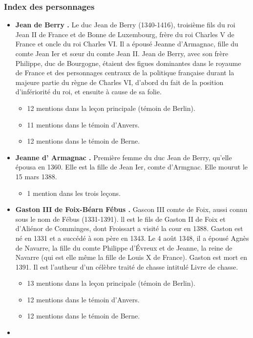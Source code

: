 \documentclass[12pt, a4paper]{article}
\begin{document}
	\subsubsection{Index des personnages}
	\begin{itemize} \item{\textbf{
				Jean
				de
				Berry
				.} Le duc Jean de Berry (1340-1416), troisième fils du roi Jean II de France et de Bonne de Luxembourg, frère du roi Charles V de France et
			oncle du roi Charles VI. Il a épousé Jeanne d'Armagnac, fille du comte Jean Ier et sœur du comte Jean II. Jean de Berry, avec son frère
			Philippe, duc de Bourgogne, étaient des figues dominantes dans le royaume de France et des personnages centraux de la politique française
			durant la majeure partie du règne de Charles VI, d'abord du fait de la position d'infériorité du roi, et ensuite à cause de sa folie. \begin{itemize} \item{12 mentions dans la leçon principale (témoin de Berlin).}  \item{11 mentions dans le témoin d'Anvers.}  \item{12 mentions dans le témoin de Berne.}  \end{itemize}}  \item{\textbf{
				Jeanne
				d'
				Armagnac
				.} Première femme du duc Jean de Berry, qu'elle épousa en 1360. Elle est la fille de Jean Ier, comte d'Armgnac.
			Elle mourut le 15 mars 1388. \begin{itemize} \item{1 mention dans les trois leçons.}  \end{itemize}}  \item{\textbf{
				Gaston
				III
				de
				Foix-Béarn
				Fébus
				.} Gascon III comte de Foix, aussi connu sous le nom de Fébus (1331-1391). ll est le fils de Gaston II de Foix et
			d'Aliénor de Comminges, dont Froissart a visité la cour en 1388. Gaston est né en 1331 et a succédé à son père en 1343. Le 4 août 1348, il
			a épousé Agnès de Navarre, la fille du comte Philippe d'Évreux et de Jeanne, la reine de Navarre (qui est
			elle même la fille de Louis X de France). Gaston est mort en 1391. Il est l'autheur d'un célèbre traité de chasse intitulé Livre de chasse. \begin{itemize} \item{13 mentions dans la leçon principale (témoin de Berlin).}  \item{12 mentions dans le témoin d'Anvers.}  \item{12 mentions dans le témoin de Berne.}  \end{itemize}}  \item{\textbf{
}}
\end{itemize}
\end{document}
